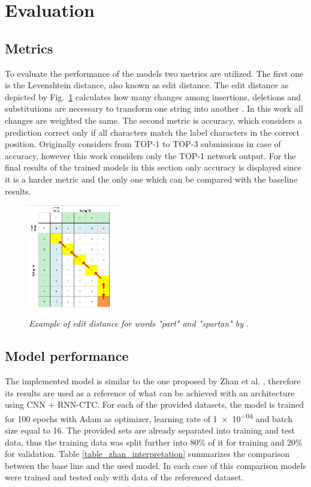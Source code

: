 \section{Evaluation}

\subsection{Metrics}

To evaluate the performance of the models two metrics are utilized. The first one is the Levenshtein distance, also known as edit distance. The edit distance as depicted by Fig.~\ref{fig_edit_distance} calculates how many changes among insertions, deletions and substitutions are necessary to transform one string into another \cite{rice_edit_dist}. In this work all changes are weighted the same. The second metric is accuracy, which considers a prediction correct only if all characters match the label characters in the correct position. Originally \cite{icfhr_competition} considers from TOP-1 to TOP-3 submissions in case of accuracy, however this work considers only the TOP-1 network output. For the final results of the trained models in this section only accuracy is displayed since it is a harder metric and the only one which can be compared with the baseline results. 

\begin{figure}[t]
\centerline{\includegraphics[width=40mm]{images/edit_distance}}
\caption{{\it Example of edit distance for words "part" and "spartan" by \cite{rice_edit_dist}.}}  
\label{fig_edit_distance}
\end{figure}

\subsection{Model performance}

The implemented model is similar to the one proposed by Zhan et al. \cite{zhan2017}, therefore its results are used as a reference of what can be achieved with an architecture using CNN + RNN-CTC. For each of the provided datasets, the model is trained for 100 epochs with Adam as optimizer, learning rate of \num{1e-04} and batch size equal to 16. The provided sets are already separated into training and test data, thus the training data was split further into 80\% of it for training and 20\% for validation. Table \ref{table_zhan_interpretation} summarizes the comparison between the base line and the used model. In each case of this comparison models were trained and tested only with data of the referenced dataset. 

